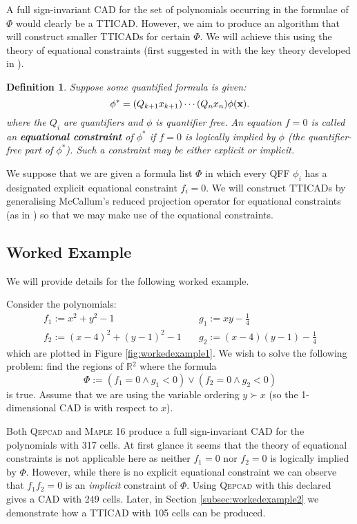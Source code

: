 \documentclass{article}
\def\R {\ensuremath{\mathbb{R}}}
\newtheorem{definition}{Definition}
\begin{document}
A full sign-invariant CAD for the set of polynomials occurring in the formulae of $\Phi$ would clearly be a TTICAD.  However, we aim to produce an algorithm that will construct smaller TTICADs for certain $\Phi$. We will achieve this using the theory of equational constraints (first suggested in \cite{Collins1998} with the key theory developed in \cite{McCallum1999a}).
\begin{definition}
Suppose some quantified formula is given:
\begin{equation*}
\phi^* = (Q_{k+1} x_{k+1})\cdots(Q_n x_n) \phi({\bf x}).
\end{equation*}
where the $Q_i$ are quantifiers and $\phi$ is quantifier free.
An equation $f=0$ is called an {\bf equational constraint} of $\phi^*$ if $f=0$ is logically implied by $\phi$ (the quantifier-free part of $\phi^*$). 
Such a constraint may be either explicit or implicit.
\end{definition}
We suppose that we are given a formula list $\Phi$ in which every QFF $\phi_i$ has a designated explicit equational constraint $f_i = 0$.
We will construct TTICADs by generalising McCallum's reduced projection operator for equational constraints (as in \cite{McCallum1999a}) so that we may make use of the equational constraints.

\subsection{Worked Example}
\label{workedexample}

We will provide details for the following worked example.


\noindent Consider the polynomials:
\begin{align*}
f_1 := x^2+y^2-1 \qquad \qquad \qquad & g_1 := xy - \tfrac{1}{4} \\
f_2 := (x-4)^2+(y-1)^2-1  \quad & g_2 := (x-4)(y-1) - \tfrac{1}{4}
\end{align*}
which are plotted in Figure \ref{fig:workedexample1}.
We wish to solve the following problem: find the regions of $\R{}^2$ where the formula
\begin{equation*}
\Phi:= \left(f_1 = 0 \land g_1 < 0 \right)\lor \left( f_2 = 0 \land g_2 < 0   \right)
\end{equation*}
is true.  Assume that we are using the variable ordering $y \succ x$ (so the 1-dimensional CAD is with respect to $x$).

Both \textsc{Qepcad} \cite{Brown03} and \textsc{Maple} 16 \cite{Chenetal2009d} produce a full sign-invariant CAD for the polynomials with 317 cells.  At first glance it seems that the theory of equational constraints \cite{McCallum1999a,McCallum2001,BrownMcCallum2005} is not applicable here as neither $f_1 = 0$ nor $f_2 = 0$ is logically implied by $\Phi$.  However, while there is no explicit equational constraint we can observe that $f_1f_2 = 0$ is an {\em implicit} constraint of $\Phi$.  Using \textsc{Qepcad} with this declared gives a CAD with 249 cells.  Later, in Section \ref{subsec:workedexample2} we demonstrate how a TTICAD with 105 cells can be produced.
\end{document}
